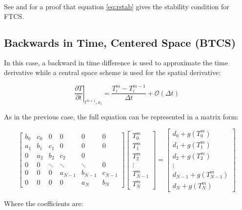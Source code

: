 See \parencite[][]{ref:proveR1} and \parencite[][]{ref:proveR2} for a proof that equation \ref{eq:rstab} gives the stability condition for FTCS. 

\subsection{Backwards in Time, Centered Space (BTCS)}

In this case, a backward in time difference is used to approximate the time derivative while a central space scheme is used for the spatial derivative: 

\begin{equation}
    \left. \frac{\partial T}{\partial t} \right|_{t^{m+1},x_i} = \frac{T^m_i - T^{m-1}_i}{\Delta t}+\mathcal{O}(\Delta t)
\end{equation}

As in the previous case, the full equation can be represented in a matrix form: 

$$
\begin{bmatrix}
         b_0 & c_0 & 0 & 0 & 0 & 0 \\
         a_1 & b_1 & c_1 & 0 & 0 & 0 \\ 
         0 & a_2 & b_2 & c_2 & 0 \\ 
         0 & 0 & \ddots & \ddots & \ddots & 0 \\
         0 & 0 & 0 & a_{N-1} & b_{N-1} & c_{N-1} \\
         0 & 0 & 0 & 0 & a_N & b_N 
     \end{bmatrix}
\begin{bmatrix}
         T^m_0  \\
         T^m_1 \\ 
         T^m_2  \\ 
         \vdots \\
         T^m_{N-1} \\
         T^m_N 
     \end{bmatrix}
     =
     \begin{bmatrix}
         d_0 + g(T^m_0) \\
         d_1 + g(T^m_1)\\ 
         d_2 + g(T^m_2)\\ 
         \vdots\\ 
         d_{N-1} + g(T^m_{N-1})\\
         d_{N} + g(T^m_{N}) 
     \end{bmatrix}
$$

Where the coefficients are:

